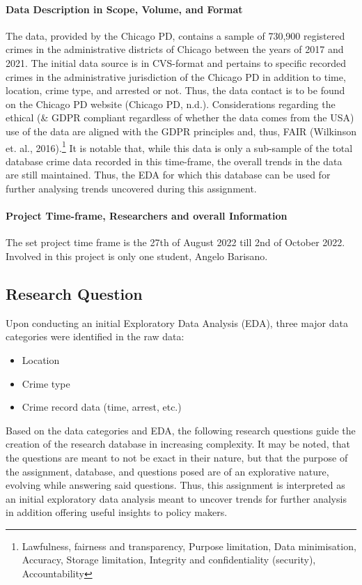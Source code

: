\documentclass[a4paper]{article}
\begin{document}
\paragraph{Data Description in Scope, Volume, and Format}
The data, provided by the Chicago PD, contains a sample of 730,900 registered crimes in the administrative districts of Chicago between the years of 2017 and 2021. The initial data source is in CVS-format and pertains to specific recorded crimes in the administrative jurisdiction of the Chicago PD in addition to time, location, crime type, and arrested or not. Thus, the data contact is to be found on the Chicago PD website (Chicago PD, n.d.). Considerations regarding the ethical (\& GDPR compliant regardless of whether the data comes from the USA) use of the data are aligned with the GDPR principles and, thus, FAIR (Wilkinson et. al., 2016).\footnote{Lawfulness, fairness and transparency, Purpose limitation, Data minimisation, Accuracy, Storage limitation, Integrity and confidentiality (security), Accountability} It is notable that, while this data is only a sub-sample of the total database crime data recorded in this time-frame, the overall trends in the data are still maintained. Thus, the EDA for which this database can be used for further analysing trends uncovered during this assignment. 

\paragraph{Project Time-frame, Researchers and overall Information} The set project time frame is the 27th of August 2022 till 2nd of October 2022. Involved in this project is only one student, Angelo Barisano.



\subsection{Research Question}
Upon conducting an initial Exploratory Data Analysis (EDA), three major data categories were identified in the raw data: 

\begin{itemize}
  \item Location
  \item Crime type
  \item Crime record data (time, arrest, etc.)
\end{itemize}

Based on the data categories and EDA, the following research questions guide the creation of the research database in increasing complexity. It may be noted, that the questions are meant to not be exact in their nature, but that the purpose of the assignment, database, and questions posed are of an explorative nature, evolving while answering said questions. Thus, this assignment is interpreted as an initial exploratory data analysis meant to uncover trends for further analysis in addition offering useful insights to policy makers. 
\end{document}
